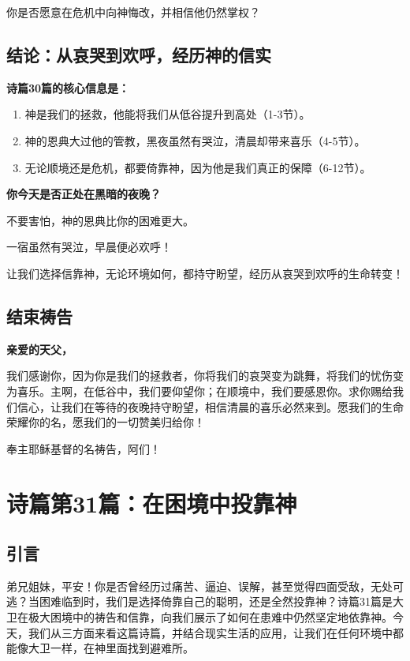 \documentclass[a4paper, 12pt]{article}
\begin{document}
\hspace{0.6cm}你是否愿意在危机中向神悔改，并相信他仍然掌权？
\subsection*{结论：从哀哭到欢呼，经历神的信实}

\hspace{0.6cm}\textbf{诗篇30篇的核心信息是：}
\begin{enumerate}
    \leftskip=0.7cm
    \item 神是我们的拯救，他能将我们从低谷提升到高处（1-3节）。

    \item 神的恩典大过他的管教，黑夜虽然有哭泣，清晨却带来喜乐（4-5节）。

    \item 无论顺境还是危机，都要倚靠神，因为他是我们真正的保障（6-12节）。

\end{enumerate}

\textbf{你今天是否正处在黑暗的夜晚？}

\hspace{0.6cm}不要害怕，神的恩典比你的困难更大。

\hspace{0.6cm}一宿虽然有哭泣，早晨便必欢呼！

让我们选择信靠神，无论环境如何，都持守盼望，经历从哀哭到欢呼的生命转变！

\subsection*{结束祷告}
\textbf{亲爱的天父，}

我们感谢你，因为你是我们的拯救者，你将我们的哀哭变为跳舞，将我们的忧伤变为喜乐。主啊，在低谷中，我们要仰望你；在顺境中，我们要感恩你。求你赐给我们信心，让我们在等待的夜晚持守盼望，相信清晨的喜乐必然来到。愿我们的生命荣耀你的名，愿我们的一切赞美归给你！

奉主耶稣基督的名祷告，阿们！
\newpage
\section{诗篇第31篇：在困境中投靠神}
\subsection*{引言}
\hspace{0.6cm}弟兄姐妹，平安！你是否曾经历过痛苦、逼迫、误解，甚至觉得四面受敌，无处可逃？当困难临到时，我们是选择倚靠自己的聪明，还是全然投靠神？诗篇31篇是大卫在极大困境中的祷告和信靠，向我们展示了如何在患难中仍然坚定地依靠神。今天，我们从三方面来看这篇诗篇，并结合现实生活的应用，让我们在任何环境中都能像大卫一样，在神里面找到避难所。
\end{document}
